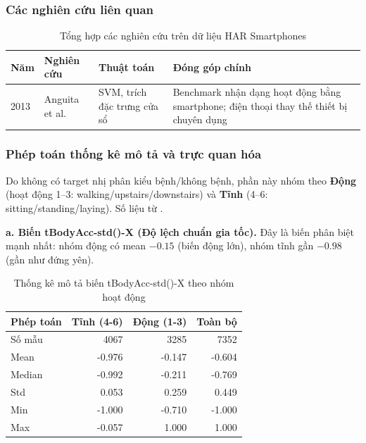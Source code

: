 \subsubsection{Các nghiên cứu liên quan}

\begin{table}[H]
\centering
\caption{Tổng hợp các nghiên cứu trên dữ liệu HAR Smartphones}
\label{tab:har_research_review}
\small
\begin{tabular}{p{}p{}p{}p{}}
\toprule
Năm & Nghiên cứu & Thuật toán & Đóng góp chính \\
\midrule
2013 & Anguita et al. \cite{Anguita2013HAR} & SVM, trích đặc trưng cửa sổ & Benchmark nhận dạng hoạt động bằng smartphone; điện thoại thay thế thiết bị chuyên dụng \\
\bottomrule
\end{tabular}
\end{table}

\subsubsection{Phép toán thống kê mô tả và trực quan hóa}

Do không có target nhị phân kiểu bệnh/không bệnh, phần này nhóm theo \textbf{Động} (hoạt động 1--3: walking/upstairs/downstairs) và \textbf{Tĩnh} (4--6: sitting/standing/laying). Số liệu từ .

\textbf{a. Biến tBodyAcc-std()-X (Độ lệch chuẩn gia tốc).} Đây là biến phân biệt mạnh nhất: nhóm động có mean $-0.15$ (biến động lớn), nhóm tĩnh gần $-0.98$ (gần như đứng yên).

\begin{table}[H]
\centering
\caption{Thống kê mô tả biến tBodyAcc-std()-X theo nhóm hoạt động}
\label{tab:har_std_stats}
\small
\begin{tabular}{lrrr}
\toprule
Phép toán & Tĩnh (4-6) & Động (1-3) & Toàn bộ \\
\midrule
Số mẫu & 4067 & 3285 & 7352 \\
Mean & -0.976 & -0.147 & -0.604 \\
Median & -0.992 & -0.211 & -0.769 \\
Std & 0.053 & 0.259 & 0.449 \\
Min & -1.000 & -0.710 & -1.000 \\
Max & -0.057 & 1.000 & 1.000 \\
\bottomrule
\end{tabular}
\end{table}

